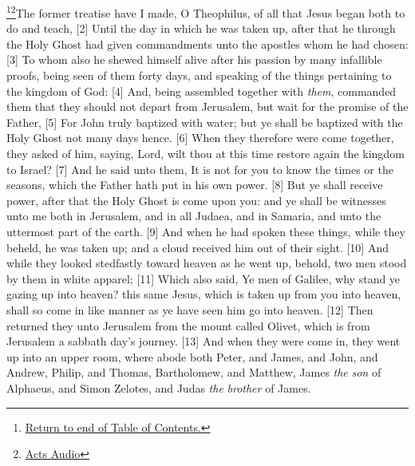 
\footnote{\textcolor[cmyk]{0.99998,1,0,0}{\hyperlink{TOC}{Return to end of Table of Contents.}}}\footnote{\href{https://www.audioverse.org/english/audiobibles/books/ENGKJV/N/Acts/1}{\textcolor[cmyk]{0.99998,1,0,0}{Acts Audio}}}\textcolor[cmyk]{0.99998,1,0,0}{The former treatise have I made, O Theophilus, of all that Jesus began both to do and teach,}
[2] \textcolor[cmyk]{0.99998,1,0,0}{Until the day in which he was taken up, after that he through the Holy Ghost had given commandments unto the apostles whom he had chosen:}
[3] \textcolor[cmyk]{0.99998,1,0,0}{To whom also he shewed himself alive after his passion by many infallible proofs, being seen of them forty days, and speaking of the things pertaining to the kingdom of God:}
[4] \textcolor[cmyk]{0.99998,1,0,0}{And, being assembled together with \emph{them}, commanded them that they should not depart from Jerusalem, but wait for the promise of the Father,} 
[5] \textcolor[rgb]{1.00,0.00,0.00}{For John truly baptized with water; but ye shall be baptized with the Holy Ghost not many days hence.}
[6] \textcolor[cmyk]{0.99998,1,0,0}{When they therefore were come together, they asked of him, saying, Lord, wilt thou at this time restore again the kingdom to Israel?}
[7] \textcolor[cmyk]{0.99998,1,0,0}{And he said unto them, It is not for you to know the times or the seasons, which the Father hath put in his own power.}
[8] \textcolor[rgb]{1.00,0.00,0.00}{But ye shall receive power, after that the Holy Ghost is come upon you: and ye shall be witnesses unto me both in Jerusalem, and in all Judaea, and in Samaria, and unto the uttermost part of the earth.}
[9] \textcolor[cmyk]{0.99998,1,0,0}{And when he had spoken these things, while they beheld, he was taken up; and a cloud received him out of their sight.}
[10] \textcolor[cmyk]{0.99998,1,0,0}{And while they looked stedfastly toward heaven as he went up, behold, two men stood by them in white apparel;}
[11] \textcolor[cmyk]{0.99998,1,0,0}{Which also said, Ye men of Galilee, why stand ye gazing up into heaven? this same Jesus, which is taken up from you into heaven, shall so come in like manner as ye have seen him go into heaven.}
[12] \textcolor[cmyk]{0.99998,1,0,0}{Then returned they unto Jerusalem from the mount called Olivet, which is from Jerusalem a sabbath day's journey.}
[13] \textcolor[cmyk]{0.99998,1,0,0}{And when they were come in, they went up into an upper room, where abode both Peter, and James, and John, and Andrew, Philip, and Thomas, Bartholomew, and Matthew, James \emph{the} \emph{son} of Alphaeus, and Simon Zelotes, and Judas \emph{the} \emph{brother} of James.}
